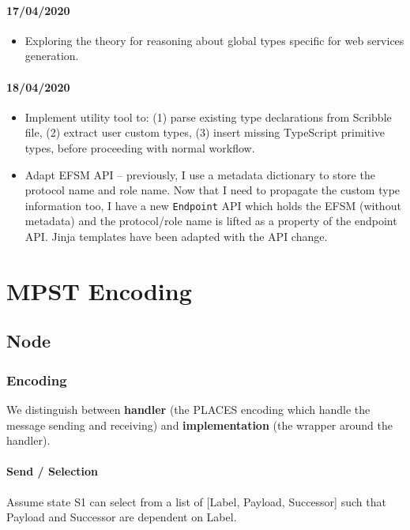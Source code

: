 \documentclass{article}
\begin{document}
\paragraph{17/04/2020}
\begin{itemize}
\item
Exploring the theory for reasoning about global types
specific for web services generation.
\end{itemize}

\paragraph{18/04/2020}
\begin{itemize}
\item
Implement utility tool to: (1) parse existing type declarations
from Scribble file, (2) extract user custom types,
(3) insert missing TypeScript primitive types, before proceeding
with normal workflow.

\item
Adapt EFSM API -- previously, I use a metadata dictionary
to store the protocol name and role name. Now that I need to
propagate the custom type information too, I have a new 
\texttt{Endpoint} API which holds the EFSM (without metadata)
and the protocol/role name is lifted as a property of the 
endpoint API. Jinja templates have been adapted with the
API change.
\end{itemize}

\section{MPST Encoding}

\subsection{Node}

\subsubsection{Encoding}
We distinguish between \textbf{handler} (the PLACES encoding which handle the
message sending and receiving) and \textbf{implementation} (the wrapper around the handler).

\paragraph{Send / Selection}
Assume state S1 can select from a list of [Label, Payload, Successor] such that Payload and Successor
are dependent on Label.
\end{document}
